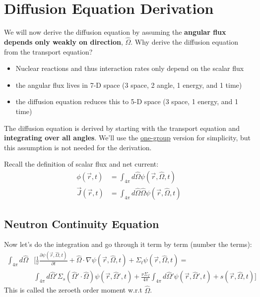 \documentclass[12pt]{article}
\newlength{\up}
\newcommand{\vOmega}{\ensuremath{\hat{\Omega}}}
\begin{document}
\section{Diffusion Equation Derivation}

We will now derive the diffusion equation by assuming the \textbf{angular flux depends only weakly on direction}, $\vOmega$. 
%
Why derive the diffusion equation from the transport equation?
\begin{itemize}
\item Nuclear reactions and thus interaction rates only depend on the scalar flux
\item the angular flux lives in 7-D space (3 space, 2 angle, 1 energy, and 1 time)
\item the diffusion equation reduces this to 5-D space (3 space, 1 energy, and 1 time)
\end{itemize}

The diffusion equation is derived by starting with the transport equation and \textbf{integrating over all angles}. We'll use the \underline{one-group} version for simplicity, but this assumption is not needed for the derivation. 

Recall the definition of scalar flux and net current:
\begin{align}
\phi(\vec{r}, t) &= \int_{4\pi} d\vOmega \psi(\vec{r}, \vOmega, t) \\
\vec{J}(\vec{r}, t) &= \int_{4\pi} d\vOmega \vOmega \psi(\vec{r}, \vOmega, t)
\end{align}

\subsection{Neutron Continuity Equation}
Now let's do the integration and go through it term by term (number the terms):
%
\begin{align}
\int_{4\pi} d\vOmega &\biggl[\frac{1}{v}\frac{\partial \psi(\vec{r}, \vOmega, t)}{\partial t} + 
\vOmega \cdot \nabla \psi(\vec{r}, \vOmega, t) +
\Sigma_t \psi(\vec{r}, \vOmega, t) = \nonumber\\
%
&\int_{4\pi} d\vOmega' \Sigma_s(\vOmega' \cdot \vOmega) \psi(\vec{r}, \vOmega', t)  
+ \frac{\nu \Sigma_f}{4\pi} \int_{4\pi} d\vOmega' \psi(\vec{r},  \vOmega', t)
+ s(\vec{r}, \vOmega, t)\biggr]
\end{align}
%
This is called the zeroeth order moment w.r.t $\vOmega$. 
\end{document}
